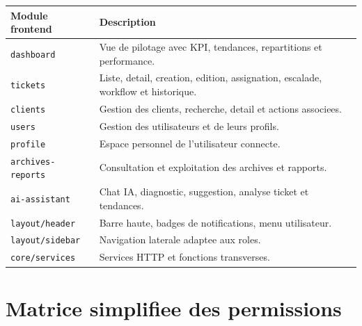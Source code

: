 \documentclass[12pt,a4paper,oneside]{report}
\begin{document}
\begin{longtable}{>{\raggedright\arraybackslash}p{4.1cm} >{\raggedright\arraybackslash}p{9.2cm}}
\toprule
Module frontend & Description \\
\midrule
\texttt{dashboard} & Vue de pilotage avec KPI, tendances, repartitions et performance. \\
\texttt{tickets} & Liste, detail, creation, edition, assignation, escalade, workflow et historique. \\
\texttt{clients} & Gestion des clients, recherche, detail et actions associees. \\
\texttt{users} & Gestion des utilisateurs et de leurs profils. \\
\texttt{profile} & Espace personnel de l'utilisateur connecte. \\
\texttt{archives-reports} & Consultation et exploitation des archives et rapports. \\
\texttt{ai-assistant} & Chat IA, diagnostic, suggestion, analyse ticket et tendances. \\
\texttt{layout/header} & Barre haute, badges de notifications, menu utilisateur. \\
\texttt{layout/sidebar} & Navigation laterale adaptee aux roles. \\
\texttt{core/services} & Services HTTP et fonctions transverses. \\
\bottomrule
\end{longtable}

\chapter{Matrice simplifiee des permissions}
\end{document}
